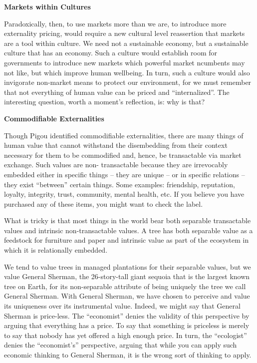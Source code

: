 \documentclass[
]{book}
\begin{document}
\textbf{Markets within Cultures}

Paradoxically, then, to use markets more than we are, to introduce more externality pricing,
would require a new cultural level reassertion that markets are a tool within culture. We need
not a sustainable economy, but a sustainable culture that has an economy. Such a culture
would establish room for governments to introduce new markets which powerful market
ncumbents may not like, but which improve human wellbeing. In turn, such a culture would
also invigorate non-market means to protect our environment, for we must remember that not
everything of human value can be priced and ``internalized''. The interesting question, worth a
moment's reflection, is: why is that?

\textbf{Commodifiable Externalities}

Though Pigou identified commodifiable externalities, there are many things of human value
that cannot withstand the disembedding from their context necessary for them to be
commodified and, hence, be transactable via market exchange. Such values are non-
transactable because they are irrevocably embedded either in specific things -- they are
unique -- or in specific relations -- they exist ``between'' certain things. Some examples:
friendship, reputation, loyalty, integrity, trust, community, mental health, etc. If you believe you
have purchased any of these items, you might want to check the label.

What is tricky is that most things in the world bear both separable transactable values and
intrinsic non-transactable values. A tree has both separable value as a feedstock for furniture
and paper and intrinsic value as part of the ecosystem in which it is relationally embedded.

We tend to value trees in managed plantations for their separable values, but we value
General Sherman, the 26-story-tall giant sequoia that is the largest known tree on Earth, for
its non-separable attribute of being uniquely the tree we call General Sherman.
With General Sherman, we have chosen to perceive and value its uniqueness over its
instrumental value. Indeed, we might say that General Sherman is price-less. The
``economist'' denies the validity of this perspective by arguing that everything has a price. To
say that something is priceless is merely to say that nobody has yet offered a high enough
price.
In turn, the ``ecologist'' denies the ``economist's'' perspective, arguing that while you can apply
such economic thinking to General Sherman, it is the wrong sort of thinking to apply.
\end{document}

